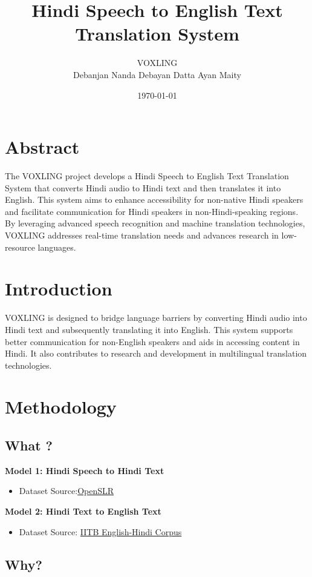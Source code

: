\documentclass{article}
\title{Hindi Speech to English Text Translation System}
\author{VOXLING\\
Debanjan Nanda\hspace{0.2cm} Debayan Datta\hspace{0.2cm} Ayan Maity}
\date{\today}
\begin{document}
\maketitle

\section*{Abstract}
The VOXLING project develops a Hindi Speech to English Text Translation System that converts Hindi audio to Hindi text and then translates it into English. This system aims to enhance accessibility for non-native Hindi speakers and facilitate communication for Hindi speakers in non-Hindi-speaking regions. By leveraging advanced speech recognition and machine translation technologies, VOXLING addresses real-time translation needs and advances research in low-resource languages.

\section*{Introduction}
VOXLING is designed to bridge language barriers by converting Hindi audio into Hindi text and subsequently translating it into English. This system supports better communication for non-English speakers and aids in accessing content in Hindi. It also contributes to research and development in multilingual translation technologies.

\section*{Methodology}
\subsection*{What ?}
\textbf{Model 1: Hindi Speech to Hindi Text}
\begin{itemize}
    \item Dataset Source:\href{https://www.openslr.org/103/}{OpenSLR}
\end{itemize}
\vspace{0.1cm}
\textbf{Model 2: Hindi Text to English Text}
\begin{itemize}
    \item Dataset Source: \href{https://www.cfilt.iitb.ac.in/iitb_parallel/}{IITB English-Hindi Corpus}
\end{itemize}
\subsection*{Why?}
\end{document}
